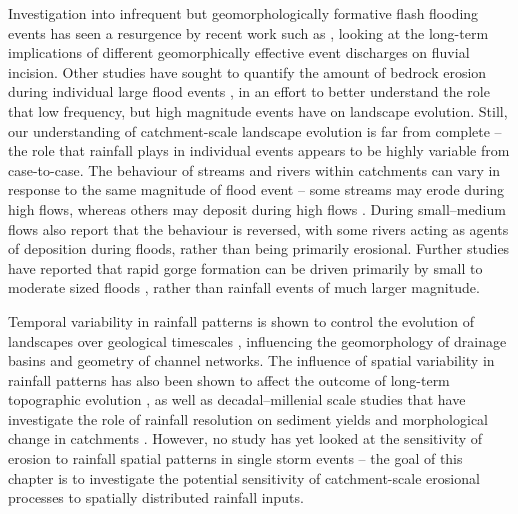 Investigation into infrequent but geomorphologically formative flash flooding events has seen a resurgence by recent work such as \citet{Huang2006}, looking at the long-term implications of different geomorphically effective event discharges on fluvial incision. Other studies have sought to quantify the amount of bedrock erosion during individual large flood events \citep[e.g.][]{gupta2007catastrophic,lamb2010rapid,baynes2015erosion}, in an effort to better understand the role that low frequency, but high magnitude events have on landscape evolution. Still, our understanding of catchment-scale landscape evolution is far from complete -- the role that rainfall plays in individual events appears to be highly variable from case-to-case. The behaviour of streams and rivers within catchments can vary in response to the same magnitude of flood event -- some streams may erode during high flows, whereas others may deposit during high flows \citep{turowski2013large}. During small--medium flows \citet{turowski2013large} also report that the behaviour is reversed, with some rivers acting as agents of deposition during floods, rather than being primarily erosional. Further studies have reported that rapid gorge formation can be driven primarily by small to moderate sized floods \citep{anton2015exceptional}, rather than rainfall events of much larger magnitude.

Temporal variability in rainfall patterns is shown to control the evolution of landscapes over geological timescales \citep{Tucker2000,Solyom2004}, influencing the geomorphology of drainage basins and geometry of channel networks. The influence of spatial variability in rainfall patterns has also been shown to affect the outcome of long-term topographic evolution \citep{solyom2007importance,han2014modeling,han2015measuring}, as well as decadal--millenial scale studies that have investigate the role of rainfall resolution on sediment yields and morphological change in catchments \citep{coulthard2016sensitivity}. However, no study has yet looked at the sensitivity of erosion to rainfall spatial patterns in single storm events -- the goal of this chapter is to investigate the potential sensitivity of catchment-scale erosional processes to spatially distributed rainfall inputs.

%

